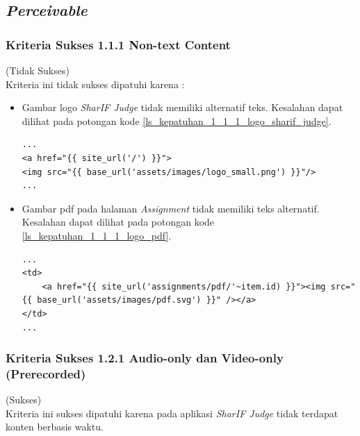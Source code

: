 \documentclass[a4paper,twoside]{article}
\begin{document}
\begin{enumerate}
		\subsection*{\textit{Perceivable}}
		\label{subsec:kepatuhan_perceivable}
		
		\subsubsection*{Kriteria Sukses 1.1.1 Non-text Content}
		\label{subsubsec:kepatuhan_kriteria_1.1.1}
		(Tidak Sukses) \\
		
		Kriteria ini tidak sukses dipatuhi karena :
		\begin{itemize}
			\item Gambar logo \textit{SharIF Judge} tidak memiliki alternatif teks. Kesalahan dapat dilihat pada potongan kode \ref{ls_kepatuhan_1_1_1_logo_sharif_judge}.
			\begin{lstlisting}[basicstyle=\ttfamily, frame=single,
			columns=fullflexible, keepspaces=true, breaklines=true, label=ls_kepatuhan_1_1_1_logo_sharif_judge, caption=Kriteria Sukses 1.1.1 - Logo SharIF Judge Tidak Diberi Teks Alternatif]
...
<a href="{{ site_url('/') }}">
<img src="{{ base_url('assets/images/logo_small.png') }}"/>
...
			\end{lstlisting}
			\item Gambar pdf pada halaman \textit{Assignment} tidak memiliki teks alternatif. Kesalahan dapat dilihat pada potongan kode \ref{ls_kepatuhan_1_1_1_logo_pdf}.
			\begin{lstlisting}[basicstyle=\ttfamily, frame=single,
			columns=fullflexible, keepspaces=true, breaklines=true, label=ls_kepatuhan_1_1_1_logo_pdf, caption=Kriteria Sukses 1.1.1 - Gambar PDF Tidak Diberi Teks Alternatif]
...
<td>
	<a href="{{ site_url('assignments/pdf/'~item.id) }}"><img src="{{ base_url('assets/images/pdf.svg') }}" /></a>
</td>
...
			\end{lstlisting}
		\end{itemize}
		
		\subsubsection*{Kriteria Sukses 1.2.1 Audio-only dan Video-only (Prerecorded)}
		\label{subsubsec:kepatuhan_kriteria_1.2.1}
		(Sukses) \\
		
		Kriteria ini sukses dipatuhi karena pada aplikasi \textit{SharIF Judge} tidak terdapat konten berbasis waktu.
		

\end{enumerate}
\end{document}
